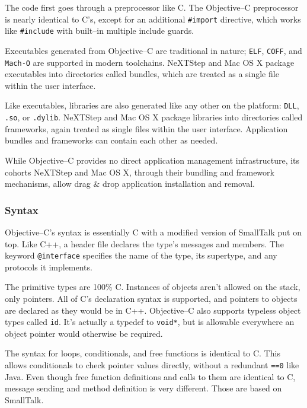 	The code first goes through a preprocessor like C.  The Objective--C preprocessor is nearly identical to C's, except for an additional \texttt{\#import} directive, which works like \texttt{\#include} with built--in multiple include guards.

	Ex\-ec\-ut\-abl\-es generated from Obj\-ect\-ive--C are traditional in nature; \texttt{ELF}, \texttt{COFF}, and \texttt{Mach-O} are supported in modern toolchains.  NeXTStep and Mac OS X package executables into directories called bundles, which are treated as a single file within the user interface.

	Like executables, libraries are also generated like any other on the platform: \texttt{DLL}, \texttt{.so}, or \texttt{.dylib}.  NeXTStep and Mac OS X package libraries into directories called frameworks, again treated as single files within the user interface.  Application bundles and frameworks can contain each other as needed.

	While Objective--C provides no direct application management infrastructure, its cohorts NeXTStep and Mac OS X, through their bundling and framework mechanisms, allow drag \& drop application installation and removal.

\subsubsection{Syntax}
	Objective--C's syntax is essentially C with a modified version of SmallTalk put on top.  Like C++, a header file declares the type's messages and members.  The keyword \texttt{@interface} specifies the name of the type, its supertype, and any protocols it implements.

	The primitive types are 100\% C.  Instances of objects aren't allowed on the stack, only pointers.  All of C's declaration syntax is supported, and pointers to objects are declared as they would be in C++.  Objective--C also supports typeless object types called \texttt{id}.  It's actually a typedef to \texttt{void*}, but is allowable everywhere an object pointer would otherwise be required.

	The syntax for loops, conditionals, and free functions is identical to C.  This allows conditionals to check pointer values directly, without a redundant \texttt{==0} like Java.  Even though free function definitions and calls to them are identical to C, message sending and method definition is very different.  Those are based on SmallTalk.


